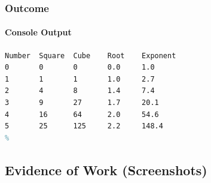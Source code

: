 \documentclass[a4paper,11pt]{article}
\theoremstyle{mytheor}
\theoremstyle{mytheor}
\begin{document}
\subsubsection{Outcome}
\paragraph{Console Output}
\begin{lstlisting}[escapechar=\%,language=tex,numbers=none,label={list:fourth},title=Program's output to console in plaintext]
Number	Square	Cube	Root	Exponent
0		0		0		0.0		1.0
1		1		1		1.0		2.7
2		4		8		1.4		7.4
3		9		27		1.7		20.1
4		16		64		2.0		54.6
5		25		125		2.2		148.4
%
\end{lstlisting}
\subsection{Evidence of Work (Screenshots)}
\end{document}
